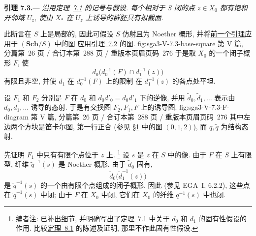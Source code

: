 
\medskip
{}\label{lem:sga3-V-7.3}%
\noindent\textbf{引理 7.3.}---%
\emph{沿用定理~\hyperref[thm:sga3-V-7.1]{7.1} 的记号与假设.
每个相对于 \(S\) 闭的点 \(z\in X_0\) 都有饱和开邻域 \(U_z\),
使由 \(X_\ast\) 在 \(U_z\) 上诱导的群胚具有拟截面.}

此断言在 \(S\) 上是局部的, 因此可假设 \(S\) 仿射且为 Noether 概形,
并将\hyperref[lem:sga3-V-7.2]{前一个引理}应用于 \((\mathbf{Sch}/S)\) 中的图
  {应用\hyperref[lem:sga3-V-7.2]{引理~7.2} 的图.}
  {fig:sga3-V-7.3-base-square}
  {第 V 篇, 分篇第~26 页 / 合订本第~288 页 / 重版本页眉页码~276}
于是取 \(X_0\) 的一个闭子概形 \(F\), 使
\[
  d_0\bigl(d_0^{-1}(F)\cap d_1^{-1}(z)\bigr)
\]
有限且非空, 并使 \(d_1\) 在 \(d_0^{-1}(F)\) 上的限制
在 \(d_1^{-1}(z)\) 的各点处平坦.

设 \(F_1\) 和 \(F_2\) 分别是 \(F\) 在 \(d_0\)
和 \(d_0d'_0=d_0d'_1\) 下的逆像,
并用 \(\widetilde d_0,\widetilde d_1,\ldots\)
表示由 \(d_0,d_1,\ldots\) 诱导的态射. 于是有交换图
  {\(F_2,F_1,F\) 上的诱导图.}
  {fig:sga3-V-7.3-F-diagram}
  {第 V 篇, 分篇第~26 页 / 合订本第~288 页 / 重版本页眉页码~276}
其中左边两个方块是笛卡尔图, 第一行正合
(参见 \hyperref[sec:sga3-V-1]{\S1} 中的图
\hyperref[sga3:v:lemma:1-2:equation:0-1-2]{\((0,1,2)\)}),
而 \(q,\widetilde q\) 为结构态射.

先证明 \(F_1\) 中只有有限个点位于 \(z\) 上.%
\footnote{\label{note:sga3-V-39}编者注: 已补出细节,
并明确写出了定理~\hyperref[thm:sga3-V-7.1]{7.1}
中关于 \(d_0\) 和 \(d_1\) 的固有性假设的作用.
比较\hyperref[thm:sga3-V-8.1]{定理~8.1} 的陈述及证明,
那里不作此固有性假设.}
设 \(s\) 是 \(z\) 在 \(S\) 中的像.
由于 \(F\) 在 \(S\) 上有限型,
纤维 \(\widetilde q^{-1}(s)\) 是 Noether 概形.
由于 \(\widetilde d_0\) 固有,
\[
  \widetilde d_0\bigl(\widetilde d_1^{-1}(z)\bigr)
\]
是 \(\widetilde q^{-1}(s)\) 的一个由有限个点组成的闭子概形.
因此 (参见 EGA~I, 6.2.2), 这些点在 \(\widetilde q^{-1}(s)\) 中闭;
由于 \(F\) 在 \(X_0\) 中闭, 它们在 \(X_0\) 的纤维 \(q^{-1}(s)\) 中也闭.

